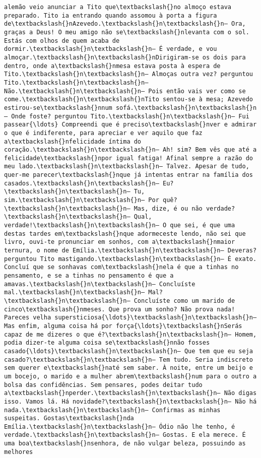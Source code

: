 \begin{Verbatim}[commandchars=\\\{\}]
alemão veio anunciar a Tito que\textbackslash{}no almoço estava preparado. Tito ia entrando quando assomou à porta a figura de\textbackslash{}nAzevedo.\textbackslash{}n\textbackslash{}n— Ora, graças a Deus! O meu amigo não se\textbackslash{}nlevanta com o sol. Estás com olhos de quem acaba de dormir.\textbackslash{}n\textbackslash{}n— É verdade, e vou almoçar.\textbackslash{}n\textbackslash{}nDirigiram-se os dois para dentro, onde a\textbackslash{}nmesa estava posta à espera de Tito.\textbackslash{}n\textbackslash{}n— Almoças outra vez? perguntou Tito.\textbackslash{}n\textbackslash{}n— Não.\textbackslash{}n\textbackslash{}n— Pois então vais ver como se come.\textbackslash{}n\textbackslash{}nTito sentou-se à mesa; Azevedo estirou-se\textbackslash{}nnum sofá.\textbackslash{}n\textbackslash{}n— Onde foste? perguntou Tito.\textbackslash{}n\textbackslash{}n— Fui passear{\ldots} Compreendi que é preciso\textbackslash{}nver e admirar o que é indiferente, para apreciar e ver aquilo que faz a\textbackslash{}nfelicidade íntima do coração.\textbackslash{}n\textbackslash{}n— Ah! sim? Bem vês que até a felicidade\textbackslash{}npor igual fatiga! Afinal sempre a razão do meu lado.\textbackslash{}n\textbackslash{}n— Talvez. Apesar de tudo, quer-me parecer\textbackslash{}nque já intentas entrar na família dos casados.\textbackslash{}n\textbackslash{}n— Eu?\textbackslash{}n\textbackslash{}n— Tu, sim.\textbackslash{}n\textbackslash{}n— Por quê?\textbackslash{}n\textbackslash{}n— Mas, dize, é ou não verdade?\textbackslash{}n\textbackslash{}n— Qual, verdade!\textbackslash{}n\textbackslash{}n— O que sei, é que uma destas tardes em\textbackslash{}nque adormeceste lendo, não sei que livro, ouvi-te pronunciar em sonhos, com a\textbackslash{}nmaior ternura, o nome de Emília.\textbackslash{}n\textbackslash{}n— Deveras? perguntou Tito mastigando.\textbackslash{}n\textbackslash{}n— É exato. Concluí que se sonhavas com\textbackslash{}nela é que a tinhas no pensamento, e se a tinhas no pensamento é que a amavas.\textbackslash{}n\textbackslash{}n— Concluíste mal.\textbackslash{}n\textbackslash{}n— Mal?\textbackslash{}n\textbackslash{}n— Concluíste como um marido de cinco\textbackslash{}nmeses. Que prova um sonho? Não prova nada! Pareces velha supersticiosa{\ldots}\textbackslash{}n\textbackslash{}n— Mas enfim, alguma coisa há por força{\ldots}\textbackslash{}nSerás capaz de me dizeres o que é?\textbackslash{}n\textbackslash{}n— Homem, podia dizer-te alguma coisa se\textbackslash{}nnão fosses casado{\ldots}\textbackslash{}n\textbackslash{}n— Que tem que eu seja casado?\textbackslash{}n\textbackslash{}n— Tem tudo. Seria indiscreto sem querer e\textbackslash{}naté sem saber. À noite, entre um beijo e um bocejo, o marido e a mulher abrem\textbackslash{}num para o outro a bolsa das confidências. Sem pensares, podes deitar tudo a\textbackslash{}nperder.\textbackslash{}n\textbackslash{}n— Não digas isso. Vamos lá. Há novidade?\textbackslash{}n\textbackslash{}n— Não há nada.\textbackslash{}n\textbackslash{}n— Confirmas as minhas suspeitas. Gostas\textbackslash{}nda Emília.\textbackslash{}n\textbackslash{}n— Ódio não lhe tenho, é verdade.\textbackslash{}n\textbackslash{}n— Gostas. E ela merece. É uma boa\textbackslash{}nsenhora, de não vulgar beleza, possuindo as melhores 
\end{Verbatim}
